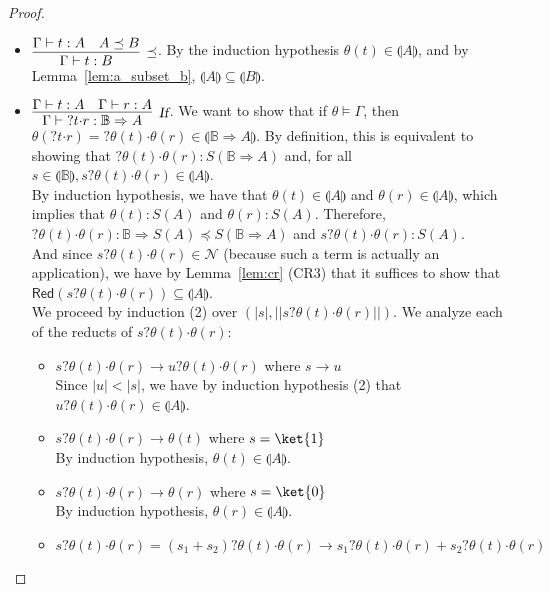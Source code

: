 \documentclass[preprint]{elsarticle}
\newcommand\interp[1]{\llparenthesis #1\rrparenthesis}
\newcommand\size[1]{||#1||}
\newcommand\Red[1]{\mathsf{Red}(#1)}
\newcommand\lpl[1]{|#1|}
\newcommand\B{\ensuremath{\mathbb B}}
\newcommand\ite[3]{{#1}?{#2}\mathord{\cdot}{#3}}
\newcommand\tif{\textsl{If}}
\newcommand{\reducesto}{\rightarrow}
\begin{document}
\begin{proof}
\begin{itemize}
  \item \( \vcenter{\infer[\preceq]{\Gamma \vdash t : B}{\Gamma \vdash t: A & A
        \preceq B}} \).
    By the induction hypothesis $\theta(t)\in\interp A$, and by
    Lemma~\ref{lem:a_subset_b}, $\interp A\subseteq\interp B$.

  \item \( \vcenter{\infer[\tif]{\Gamma \vdash \ite{}{t}{r}: \B \Rightarrow A}{\Gamma \vdash t : A
        & \Gamma \vdash r : A}} \).
    We want to show that if \( \theta \models \Gamma \), then \( \theta(\ite{}{t}{r}) = \ite{}{\theta(t)}{\theta(r)} \in \interp{\B \Rightarrow A} \). By definition, this is equivalent to showing that \( \ite{}{\theta(t)}{\theta(r)} : S(\B \Rightarrow A) \) and, for all \( s \in \interp{\B}, \ite{s}{\theta(t)}{\theta(r)} \in \interp{A} \).
    \\ By induction hypothesis, we have that \( \theta(t) \in \interp{A} \) and \( \theta(r) \in \interp{A} \), which implies that \( \theta(t) : S(A) \) and \( \theta(r) : S(A) \). Therefore, \( \ite{}{\theta(t)}{\theta(r)} : \B \Rightarrow S(A) \preceq S(\B \Rightarrow A) \) and \( \ite{s}{\theta(t)}{\theta(r)} : S(A) \).
    \\ And since \( \ite{s}{\theta(t)}{\theta(r)} \in \mathcal{N} \) (because such a term is actually an application), we have by Lemma~\ref{lem:cr} (CR3) that it suffices to show that \( \Red{\ite{s}{\theta(t)}{\theta(r)}} \subseteq \interp{A} \).
    \\ We proceed by induction (2) over \( (\lpl{s}, \size{\ite{s}{\theta(t)}{\theta(r)}}) \). We analyze each of the reducts of \( \ite{s}{\theta(t)}{\theta(r)} \):
    \begin{itemize}
    \item \( \ite{s}{\theta(t)}{\theta(r)} \reducesto \ite{u}{\theta(t)}{\theta(r)} \) where \( s \reducesto u \)
      \\ Since \( \lpl{u} < \lpl{s} \), we have by induction hypothesis (2) that \( \ite{u}{\theta(t)}{\theta(r)} \in \interp{A} \).
    \item \( \ite{s}{\theta(t)}{\theta(r)} \reducesto \theta(t) \) where \( s = \ket{1} \)
      \\ By induction hypothesis, \( \theta(t) \in \interp{A} \).
    \item \( \ite{s}{\theta(t)}{\theta(r)} \reducesto \theta(r) \) where \( s = \ket{0} \)
      \\ By induction hypothesis, \( \theta(r) \in \interp{A} \).
    \item \( \ite{s}{\theta(t)}{\theta(r)} = \ite{(s_1 + s_2)}{\theta(t)}{\theta(r)} \reducesto \ite{s_1}{\theta(t)}{\theta(r)} + \ite{s_2}{\theta(t)}{\theta(r)} \)

\end{itemize}
\end{itemize}
\end{proof}
\end{document}
